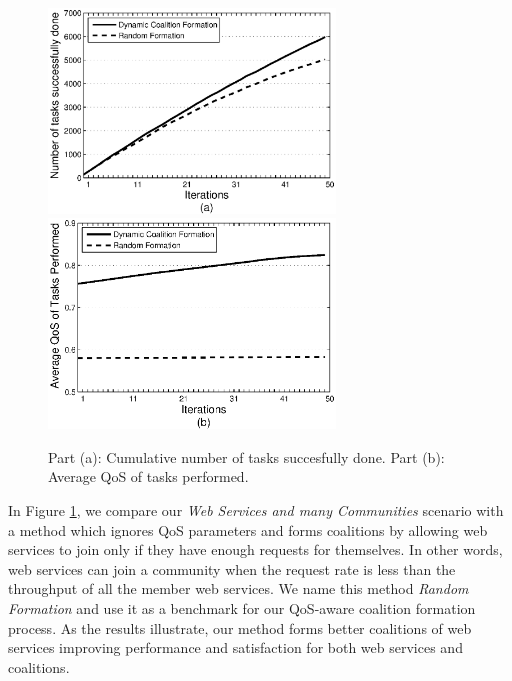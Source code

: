 \begin{figure}[!t]
\centering
\includegraphics[width=3in]{Figures/s2_task_done.eps}
\includegraphics[width=3in]{Figures/s2_task_qos.eps}
\caption{Part (a): Cumulative number of tasks succesfully done. Part
(b): Average QoS of tasks performed.} \label{performancemany}
\end{figure}

In Figure \ref{performancemany}, we compare our \emph{Web Services
and many Communities} scenario with a method which ignores QoS
parameters and forms coalitions by allowing web services to join
only if they have enough requests for themselves. In other words,
web services can join a community when the request rate is less
than the throughput of all the member web services. We name this
method \emph{Random Formation} and use it as a benchmark for our
QoS-aware coalition formation process. As the results illustrate,
our method forms better coalitions of web services improving
performance and satisfaction for both web services and coalitions.


